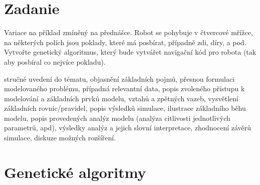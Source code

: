 \documentclass[10pt]{paper}
\begin{document}

\section{Zadanie}

Variace na příklad zmíněný na přednášce. Robot se pohybuje v čtvercové mřížce, na některých polích jsou poklady, které má posbírat, případně zdi, díry, a pod. Vytvořte genetický algoritmus, který bude vytvářet navigační kód pro robota (tak aby posbíral co nejvíce pokladu).


stručné uvedení do tématu, objasnění základních pojmů,
přesnou formulaci modelovaného problému, případná relevantní data,
popis zvoleného přístupu k modelování a základních prvků modelu, vztahů a zpětných vazeb, vysvětlení základních rovnic/pravidel,
popis výsledků simulace, ilustrace základního běhu modelu,
popis provedených analýz modelu (analýza citlivosti jednotlivých parametrů, apd), výsledky analýz a jejich slovní interpretace,
zhodnocení závěrů simulace, diskuze možných rozšíření.

\section{Genetické algoritmy}
 
\end{document}
